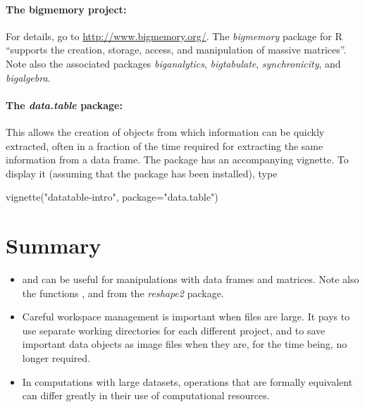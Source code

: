 \paragraph{The bigmemory project:} For details, go to
\url{http://www.bigmemory.org/}. The {\em bigmemory} package for R
``supports the creation, storage, access, and manipulation of massive
matrices''. Note also the associated packages {\em biganalytics}, {\em bigtabulate},
{\em synchronicity}, and {\em bigalgebra}.

\paragraph{The \textit{data.table} package:}
This allows the creation
of  objects from which information can be quickly
extracted, often in a fraction of the time required for extracting the
same information from a data frame.  The package has an accompanying
vignette.  To display it (assuming that the package has been
installed), type
\begin{Schunk}
\begin{Sinput}
vignette("datatable-intro", package="data.table")
\end{Sinput}
\end{Schunk}

\section{Summary}
\begin{itemize}
\item[]  and  can be useful for
  manipulations with data frames and matrices.  Note also the
  functions ,  and  from the
  \textit{reshape2} package.

\item[] Careful workspace management is important when files
are large.  It pays to use separate working directories for each
different project, and to save important data objects as image files
when they are, for the time being, no longer required.

\item[] In computations with large datasets, operations that
are formally equivalent can differ greatly in their use of
computational resources.

\end{itemize}

